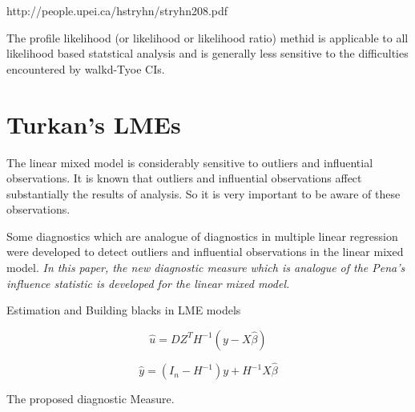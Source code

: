 \documentclass[12pt, a4paper]{report}
\theoremstyle{plain}
\theoremstyle{definition}
\theoremstyle{remark}
\begin{document}

http://people.upei.ca/hstryhn/stryhn208.pdf

The profile likelihood (or likelihood or likelihood ratio) methid is applicable to 
all likelihood based statstical analysis and is generally less sensitive to the difficulties
encountered by walkd-Tyoe CIs.



\section{Turkan's LMEs}


The linear mixed model is considerably sensitive to outliers and influential observations. 
It is known that outliers and influential observations affect substantially the results of analysis. 
So it is very important to be aware of these observations. 

Some diagnostics which are analogue of diagnostics in multiple linear regression were developed to detect 
outliers and influential observations in the linear mixed model. 
\emph{
	In this paper, the new diagnostic measure which is analogue of the Pena's influence statistic is developed for 
	the linear mixed model.
}
\newpage


Estimation and Building blacks in LME models


\[ \hat{u} = DZ^{T}H^{-1}(y-X\hat{\beta}) \]

\[ \hat{y} = (I_n -  H^{-1})y + H^{-1}X\hat{\beta}\]


The proposed diagnostic Measure.

\end{document}
